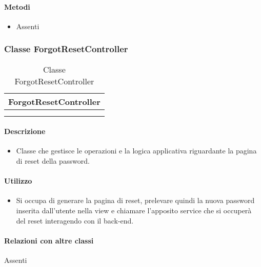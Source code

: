 \paragraph*{Metodi}
\begin{itemize}
\item[] Assenti
\end{itemize}

\subsubsection{Classe ForgotResetController}

\begin{table}[ht]
\begin{center}
\bgroup
\setlength{\arrayrulewidth}{0.6mm}
\def\arraystretch{1}
\begin{tabular}{ | p{12cm} | }
\hline
\centerline{\textbf{ForgotResetController}}
\\ \hline
 \\ 
\hline
 \\ 
\hline
\end{tabular}
\egroup
\caption{Classe ForgotResetController}
\end{center}
\end{table}

\paragraph*{Descrizione}
\begin{itemize}
\item[] Classe che gestisce le operazioni e la logica applicativa riguardante la pagina di reset della password.
\end{itemize}

\paragraph*{Utilizzo}
\begin{itemize}
\item[] Si occupa di generare la pagina di reset, prelevare quindi la nuova password inserita dall'utente nella view e chiamare l'apposito service che si occuperà del reset interagendo con il back-end.
\end{itemize}

\paragraph*{Relazioni con altre classi}
Assenti

